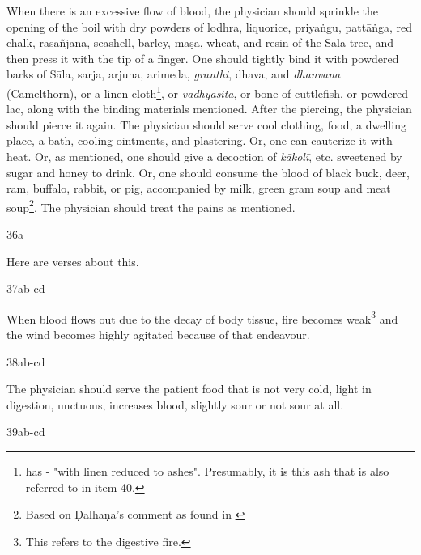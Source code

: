 \begin{translation}
When there is an excessive flow of blood, the physician should sprinkle the 
opening of the boil with dry powders of \gls{lodhra}, liquorice, \gls{priyaṅgu}, 
\gls{pattāṅga}, red chalk, \gls{rasāñjana}, seashell, barley, \gls{māṣa}, 
wheat, and resin of the Sāla tree, and then press it with the tip of a finger. 
One should tightly bind it with powdered barks of Sāla, \gls{sarja}, \gls{arjuna}, \gls{arimeda}, \emph{granthi}, \gls{dhava}, and \emph{dhanvana} (Camelthorn), or a linen cloth\footnote{\cite[66]{vulgate} has  - "with linen reduced to ashes". Presumably, it is this ash that is also referred to in item 40.}, or \emph{vadhyāsita}, or bone of cuttlefish, or powdered lac, along with the binding materials mentioned. 
After the piercing, the physician should pierce it again. 
The physician should serve cool clothing, food, a dwelling place, a bath, cooling 
ointments, and plastering. Or, one can cauterize
it with heat. Or, as 
mentioned, one should give a decoction of \emph{kākolī}, etc. sweetened by sugar and honey to drink. 
Or, one should consume the blood of black buck, deer, ram, buffalo, rabbit, or pig, accompanied by milk, green gram soup and meat soup\footnote{Based on Ḍalhaṇa's comment as found in \cite[66]{vulgate}}. 
The physician should treat the pains as mentioned. 

\item[36a]

Here are verses about this.

\item[37ab-cd]

\begin{sloka}
When blood flows out due to the decay of body tissue, fire becomes weak\footnote{This refers to the digestive fire.} and the wind becomes highly agitated because of that endeavour.
\end{sloka}

\item[38ab-cd]

\begin{sloka}
The physician should serve the patient food that is not very cold, light in digestion, unctuous, increases blood, slightly sour or not sour at all. 
\end{sloka}

\item[39ab-cd]


\end{translation}

